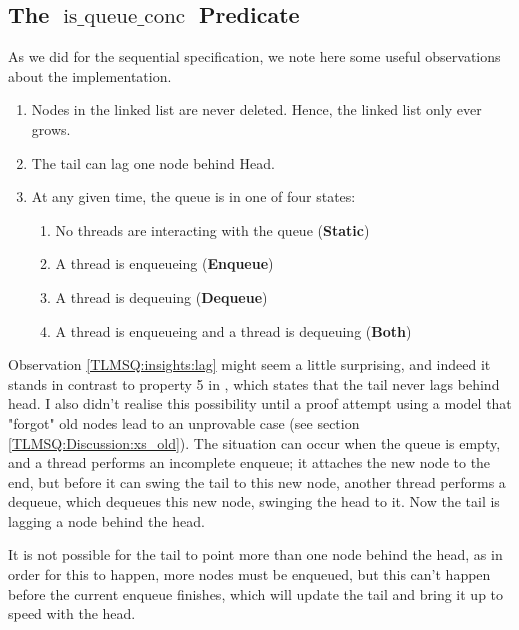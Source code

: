 \documentclass[twoside,11pt,openright]{report}
\newcommand{\isqueueconc}{\operatorname{is\_queue\_conc}}
\newcommand{\StaticState}{\textbf{Static}}
\newcommand{\EnqueueState}{\textbf{Enqueue}}
\newcommand{\DequeueState}{\textbf{Dequeue}}
\newcommand{\BothState}{\textbf{Both}}
\begin{document}
\subsection[The isqueueconc predicate]{The $\isqueueconc$ Predicate}
As we did for the sequential specification, we note here some useful observations about the implementation.
\begin{enumerate}
  \item\label{TLMSQ:insights:oldnodes} Nodes in the linked list are never deleted. Hence, the linked list only ever grows.
  \item\label{TLMSQ:insights:lag} The tail can lag one node behind Head.
  \item\label{TLMSQ:insights:states} At any given time, the queue is in one of four states:
    \begin{enumerate}
      \item\label{TLMSQ:insights:state:static} No threads are interacting with the queue (\StaticState)
      \item\label{TLMSQ:insights:state:enqueue} A thread is enqueueing (\EnqueueState)
      \item\label{TLMSQ:insights:state:dequeue} A thread is dequeuing (\DequeueState)
      \item\label{TLMSQ:insights:state:both} A thread is enqueueing and a thread is dequeuing (\BothState)
    \end{enumerate}
\end{enumerate}

Observation \ref{TLMSQ:insights:lag} might seem a little surprising, and indeed it stands in contrast to property 5 in \cite{DBLP:conf/podc/MichaelS96}, which states that the tail never lags behind head. I also didn't realise this possibility until a proof attempt using a model that "forgot" old nodes lead to an unprovable case (see section \ref{TLMSQ:Discussion:xs_old}). The situation can occur when the queue is empty, and a thread performs an incomplete enqueue; it attaches the new node to the end, but before it can swing the tail to this new node, another thread performs a dequeue, which dequeues this new node, swinging the head to it. Now the tail is lagging a node behind the head.

It is not possible for the tail to point more than one node behind the head, as in order for this to happen, more nodes must be enqueued, but this can't happen before the current enqueue finishes, which will update the tail and bring it up to speed with the head.
\end{document}
